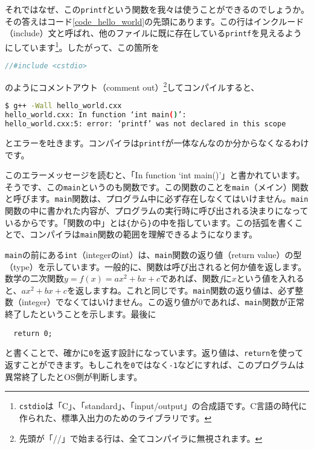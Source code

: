 それではなぜ、この\texttt{printf}という関数を我々は使うことができるのでしょうか。その答えはコード\ref{code_hello_world}の先頭にあります。この行はインクルード（include）文と呼ばれ、他のファイルに既に存在している\texttt{printf}を見えるようにしています\footnote{\texttt{cstdio}は「C」、「standard」、「input/output」の合成語です。C言語の時代に作られた、標準入出力のためのライブラリです。}。したがって、この箇所を
\begin{lstlisting}[language=c++]
//#include <cstdio>
\end{lstlisting}
のようにコメントアウト（comment out）\footnote{先頭が「//」で始まる行は、全てコンパイラに無視されます。}してコンパイルすると、
\begin{lstlisting}[language=bash]
$ g++ -Wall hello_world.cxx
hello_world.cxx: In function ‘int main()’:
hello_world.cxx:5: error: ‘printf’ was not declared in this scope
\end{lstlisting}
とエラーを吐きます。コンパイラは\texttt{printf}が一体なんなのか分からなくなるわけです。

このエラーメッセージを読むと、「In function `int main()'」と書かれています。そうです、この\texttt{main}というのも関数です。この関数のことを\texttt{main}（メイン）関数と呼びます。\texttt{main}関数は、プログラム中に必ず存在しなくてはいけません。\texttt{main}関数の中に書かれた内容が、プログラムの実行時に呼び出される決まりになっているからです。「関数の中」とは\texttt{\{}から\texttt{\}}の中を指しています。この括弧を書くことで、コンパイラは\texttt{main}関数の範囲を理解できるようになります。

\texttt{main}の前にある\texttt{int}（integerのint）は、\texttt{main}関数の返り値（return value）の型（type）を示しています。一般的に、関数は呼び出されると何か値を返します。数学の二次関数$y=f(x)=ax^2+bx+c$であれば、関数$f$に$x$という値を入れると、$ax^2+bx+c$を返しますね。これと同じです。\texttt{main}関数の返り値は、必ず整数（integer）でなくてはいけません。この返り値が0であれば、\texttt{main}関数が正常終了したということを示します。最後に
\begin{lstlisting}
  return 0; 
\end{lstlisting}
と書くことで、確かに\texttt{0}を返す設計になっています。返り値は、\texttt{return}を使って返すことができます。もしこれを\texttt{0}ではなく\texttt{-1}などにすれば、このプログラムは異常終了したとOS側が判断します。

